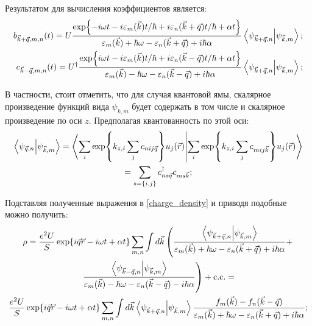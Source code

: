 \documentclass[../main.tex]{subfiles}
\begin{document}
    Результатом для вычисления коэффициентов является:
    \begin{equation}
        \label{plasmons:charge:coeffs}
        \begin{aligned}
            b_{\vec k + \vec q, m, n} (t) = U \frac{\exp{-i\omega t - i 
                \varepsilon_m (\vec k) t / \hbar + i \varepsilon_n(\vec k 
                + \vec q) t / \hbar + \alpha t}}{\varepsilon_m (\vec k) + \hbar 
                \omega - \varepsilon_n(\vec k + \vec q)+ i \hbar \alpha}
                \bra{\psi_{\vec k+\vec q, n}}\ket{\psi_{\vec k, m}}; \\
            c_{\vec k - \vec q, m, n} (t) = U^\dagger \frac{\exp{i\omega t - i 
                \varepsilon_m (\vec k) t / \hbar + i \varepsilon_n(\vec k 
                - \vec q) t / \hbar + \alpha t}}{\varepsilon_m (\vec k) - \hbar 
                \omega - \varepsilon_n(\vec k - \vec q)+ i \hbar \alpha}
                \bra{\psi_{\vec k+\vec q, n}}\ket{\psi_{\vec k, m}};
        \end{aligned}
    \end{equation}

    В частности, стоит отметить, что для случая квантовой ямы, скалярное 
    произведение функций вида $\psi_{k, m}$ будет содержать в том числе 
    и скалярное произведение по оси $z$. Предполагая квантованность по 
    этой оси:
    \begin{multline}
        \bra{\psi_{\vec q, n}}\ket{\psi_{\vec k, m}} = 
            \bra{\sum_i \exp{k_{z,i} \sum_j c_{nij \vec q}} u_j(\vec r)}
            \ket{\sum_i \exp{k_{z,i} \sum_j c_{mij \vec k}} u_j(\vec r)}\\ 
            = \sum_{s=\{i,j\}}  c^\dagger_{ns \vec q} c_{ms \vec k};
    \end{multline}

    Подставляя полученные выражения в \ref{charge_density} 
    и приводя подобные можно получить:
    \begin{multline}
        \label{charge_full}
        \rho = \frac{e^2 U}{S} \exp{i\vec q \vec r - i \omega t + \alpha t}
            \sum_{m, n} \int d\vec k \left( \frac{\bra{\psi_{\vec k + \vec q, n}}
            \ket{\psi_{\vec k, m}}}{\varepsilon_m(\vec k) + \hbar \omega - 
            \varepsilon_n(\vec k + \vec q) + i \hbar \alpha} +\right. \\ 
            \left. \frac{\bra{\psi_{\vec k - \vec q, n}}
            \ket{\psi_{\vec k, m}}}{\varepsilon_m(\vec k) - \hbar \omega - 
            \varepsilon_n(\vec k - \vec q) - i \hbar \alpha} \right) + \text{c.c.}=\\
            \frac{e^2 U}{S} \exp{i\vec q \vec r - i \omega t + \alpha t}
            \sum_{m, n} \int d\vec k \bra{\psi_{\vec k + \vec q, n}}
            \ket{\psi_{\vec k, m}} \frac{f_m(\vec k) - f_n(\vec k - \vec q)}
            {\varepsilon_m(\vec k) + \hbar \omega - \varepsilon_n(\vec k + \vec q) 
            + i \hbar \alpha};
    \end{multline}
\end{document}
